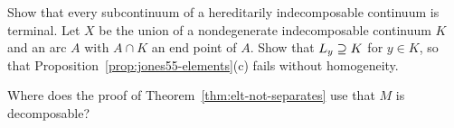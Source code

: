 \begin{exercise}
Show that every subcontinuum of a hereditarily indecomposable continuum is terminal. Let $X$ be the union of a
nondegenerate indecomposable continuum $K$ and an arc $A$ with $A\cap K$ an end point of $A$. Show that $L_{y}\supseteq K$ for
$y\in K$, so that Proposition~\ref{prop:jones55-elements}(c) fails without homogeneity.
\end{exercise}

\begin{exercise}
Where does the proof of Theorem~\ref{thm:elt-not-separates} use that $M$ is decomposable?
\end{exercise}
